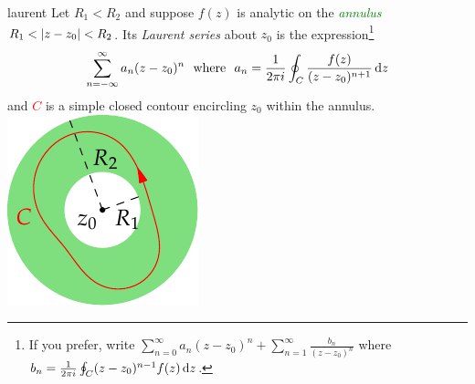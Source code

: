 \begin{defn}[lower separated=false, sidebyside, sidebyside align=top seam, sidebyside gap=0pt, righthand width=0.25\linewidth]{}{laurent}
Let $R_1<R_2$ and suppose $f(z)$ is analytic on the \textcolor{Green}{\emph{annulus}} $R_1<\left| z-z_0\right|<R_2$. Its \emph{Laurent series} about $z_0$ is the expression\footnote{If you prefer, write $\sum\limits_{n=0}^\infty a_n(z-z_0)^n+\sum\limits_{n=1}^\infty \frac{b_n}{(z-z_0)^n}$ where $b_n=\frac 1{2\pi i}\oint_C(z-z_0)^{n-1}f(z)\,{\mathrm{d} z}$.}
\[\sum_{n=-\infty}^\infty a_n(z-z_0)^n\ \text{ where }\ a_n=\frac 1{2\pi i}\oint_C\frac{f(z)}{(z-z_0)^{n+1}}\,{\mathrm{d} z}\]
and \textcolor{red}{$C$} is a simple closed contour encircling $z_0$ within the annulus.
\tcblower
\flushright\includegraphics{laurent2}
\end{defn}


